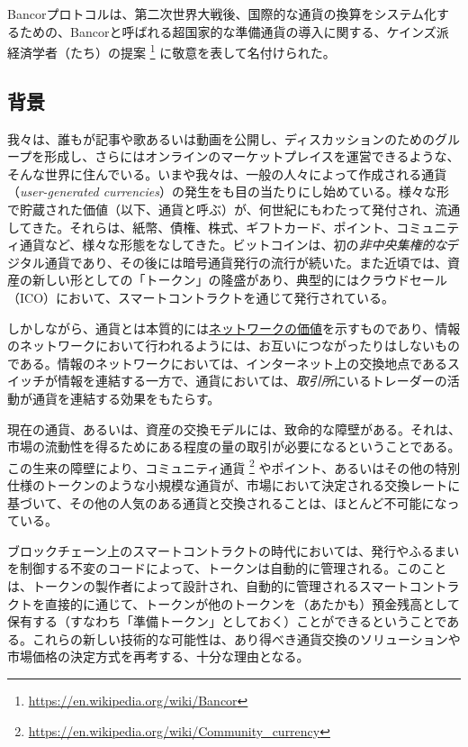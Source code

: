 \documentclass{jsarticle}
\begin{document}
Bancorプロトコルは、第二次世界大戦後、国際的な通貨の換算をシステム化するための、Bancorと呼ばれる超国家的な準備通貨の導入に関する、ケインズ派経済学者（たち）の提案
\footnote{\url{https://en.wikipedia.org/wiki/Bancor}}
に敬意を表して名付けられた。

  \subsection{背景}

  我々は、誰もが記事や歌あるいは動画を公開し、ディスカッションのためのグループを形成し、さらにはオンラインのマーケットプレイスを運営できるような、そんな世界に住んでいる。いまや我々は、一般の人々によって作成される通貨（\textit{user-generated currencies}）の発生をも目の当たりにし始めている。様々な形で貯蔵された価値（以下、通貨と呼ぶ）が、何世紀にもわたって発付され、流通してきた。それらは、紙幣、債権、株式、ギフトカード、ポイント、コミュニティ通貨など、様々な形態をなしてきた。ビットコインは、初の\emph{非中央集権的な}デジタル通貨であり、その後には暗号通貨発行の流行が続いた。また近頃では、資産の新しい形としての「トークン」の隆盛があり、典型的にはクラウドセール（ICO）において、スマートコントラクトを通じて発行されている。

  しかしながら、通貨とは本質的には\href{https://blog.bancor.network/coins-are-networks-and-crowdsales-are-their-killer-app-a6ebc16bef31}{ネットワークの価値}を示すものであり、情報のネットワークにおいて行われるようには、お互いにつながったりはしないものである。情報のネットワークにおいては、インターネット上の交換地点であるスイッチが情報を連結する一方で、通貨においては、\emph{取引所}にいるトレーダーの活動が通貨を連結する効果をもたらす。
  
  現在の通貨、あるいは、資産の交換モデルには、致命的な障壁がある。それは、市場の流動性を得るためにある程度の量の取引が必要になるということである。この生来の障壁により、コミュニティ通貨
  \footnote{\url{https://en.wikipedia.org/wiki/Community_currency}}
  やポイント、あるいはその他の特別仕様のトークンのような小規模な通貨が、市場において決定される交換レートに基づいて、その他の人気のある通貨と交換されることは、ほとんど不可能になっている。

  ブロックチェーン上のスマートコントラクトの時代においては、発行やふるまいを制御する不変のコードによって、トークンは自動的に管理される。このことは、トークンの製作者によって設計され、自動的に管理されるスマートコントラクトを直接的に通じて、トークンが他のトークンを（あたかも）預金残高として保有する（すなわち「準備トークン」としておく）ことができるということである。これらの新しい技術的な可能性は、あり得べき通貨交換のソリューションや市場価格の決定方式を再考する、十分な理由となる。
\end{document}
